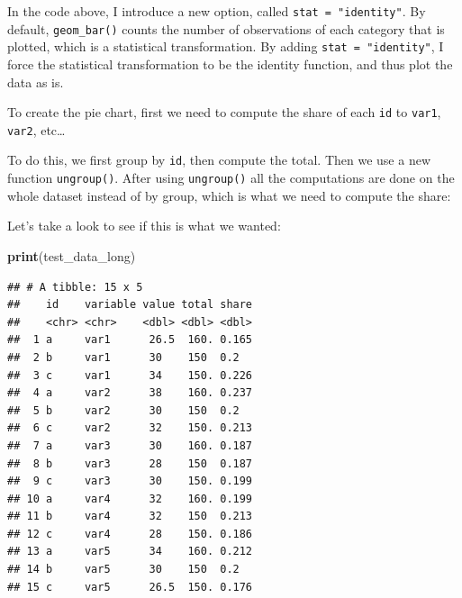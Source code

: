 \documentclass[]{gitbook}
\newenvironment{Shaded}{\begin{snugshade}}{\end{snugshade}}
\newcommand{\DataTypeTok}[1]{\textcolor[rgb]{0.13,0.29,0.53}{#1}}
\newcommand{\KeywordTok}[1]{\textcolor[rgb]{0.13,0.29,0.53}{\textbf{#1}}}
\newcommand{\NormalTok}[1]{#1}
\newcommand{\OperatorTok}[1]{\textcolor[rgb]{0.81,0.36,0.00}{\textbf{#1}}}
\newcommand{\StringTok}[1]{\textcolor[rgb]{0.31,0.60,0.02}{#1}}
\begin{document}
In the code above, I introduce a new option, called \texttt{stat\ =\ "identity"}. By default, \texttt{geom\_bar()} counts
the number of observations of each category that is plotted, which is a statistical transformation.
By adding \texttt{stat\ =\ "identity"}, I force the statistical transformation to be the identity function, and
thus plot the data as is.

To create the pie chart, first we need to compute the share of each \texttt{id} to \texttt{var1}, \texttt{var2}, etc\ldots{}

To do this, we first group by \texttt{id}, then compute the total. Then we use a new function \texttt{ungroup()}.
After using \texttt{ungroup()} all the computations are done on the whole dataset instead of by group, which
is what we need to compute the share:

\begin{Shaded}
\end{Shaded}

Let's take a look to see if this is what we wanted:

\begin{Shaded}
\begin{Highlighting}[]
\KeywordTok{print}\NormalTok{(test_data_long)}
\end{Highlighting}
\end{Shaded}

\begin{verbatim}
## # A tibble: 15 x 5
##    id    variable value total share
##    <chr> <chr>    <dbl> <dbl> <dbl>
##  1 a     var1      26.5  160. 0.165
##  2 b     var1      30    150  0.2  
##  3 c     var1      34    150. 0.226
##  4 a     var2      38    160. 0.237
##  5 b     var2      30    150  0.2  
##  6 c     var2      32    150. 0.213
##  7 a     var3      30    160. 0.187
##  8 b     var3      28    150  0.187
##  9 c     var3      30    150. 0.199
## 10 a     var4      32    160. 0.199
## 11 b     var4      32    150  0.213
## 12 c     var4      28    150. 0.186
## 13 a     var5      34    160. 0.212
## 14 b     var5      30    150  0.2  
## 15 c     var5      26.5  150. 0.176
\end{verbatim}
\end{document}
